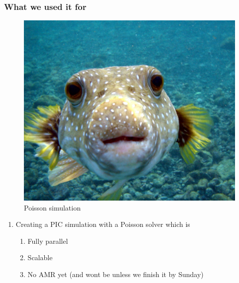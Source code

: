 \documentclass{beamer}
\begin{document}
\begin{frame}[fragile]
 \frametitle{What we used it for}
  \begin{figure}
  \centering
  \includegraphics[height=0.2\textheight]{poisson.jpg}
  \caption{\tiny{Poisson simulation}}
 \end{figure}
 \begin{enumerate}
  \item Creating a PIC simulation with a Poisson solver which is
  \begin{enumerate}
   \item Fully parallel
   \item Scalable
   \item No AMR yet (and wont be unless we finish it by Sunday)
  \end{enumerate}
 \end{enumerate}
\end{frame}
\end{document}
